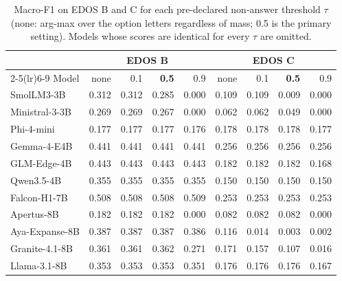 \begin{table}[t]
\centering
\small
\caption{Macro-F1 on EDOS B and C for each pre-declared non-answer threshold $\tau$ (none: arg-max over the option letters regardless of mass; 0.5 is the primary setting). Models whose scores are identical for every $\tau$ are omitted.}
\label{tab:sensitivity}
\begin{tabular}{lrrrrrrrr}
\toprule
 & \multicolumn{4}{c}{EDOS B} & \multicolumn{4}{c}{EDOS C} \\ \cmidrule(lr){2-5}\cmidrule(lr){6-9}
Model & none & 0.1 & \textbf{0.5} & 0.9 & none & 0.1 & \textbf{0.5} & 0.9 \\
\midrule
SmolLM3-3B & 0.312 & 0.312 & 0.285 & 0.000 & 0.109 & 0.109 & 0.009 & 0.000 \\
Ministral-3-3B & 0.269 & 0.269 & 0.267 & 0.000 & 0.062 & 0.062 & 0.049 & 0.000 \\
Phi-4-mini & 0.177 & 0.177 & 0.177 & 0.176 & 0.178 & 0.178 & 0.178 & 0.177 \\
Gemma-4-E4B & 0.441 & 0.441 & 0.441 & 0.441 & 0.256 & 0.256 & 0.256 & 0.256 \\
GLM-Edge-4B & 0.443 & 0.443 & 0.443 & 0.443 & 0.182 & 0.182 & 0.182 & 0.168 \\
Qwen3.5-4B & 0.355 & 0.355 & 0.355 & 0.355 & 0.150 & 0.150 & 0.150 & 0.150 \\
Falcon-H1-7B & 0.508 & 0.508 & 0.508 & 0.509 & 0.253 & 0.253 & 0.253 & 0.253 \\
Apertus-8B & 0.182 & 0.182 & 0.182 & 0.000 & 0.082 & 0.082 & 0.082 & 0.000 \\
Aya-Expanse-8B & 0.387 & 0.387 & 0.387 & 0.386 & 0.116 & 0.014 & 0.003 & 0.002 \\
Granite-4.1-8B & 0.361 & 0.361 & 0.362 & 0.271 & 0.171 & 0.157 & 0.107 & 0.016 \\
Llama-3.1-8B & 0.353 & 0.353 & 0.353 & 0.351 & 0.176 & 0.176 & 0.176 & 0.167 \\
\bottomrule
\end{tabular}
\end{table}
